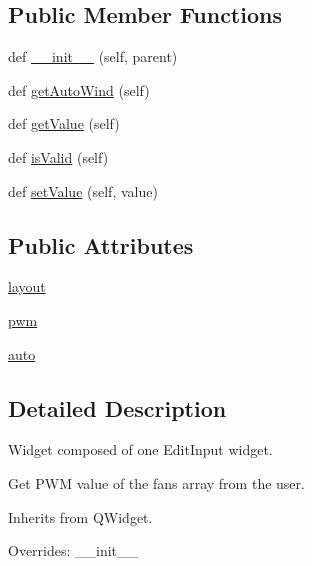 \subsection*{Public Member Functions}
\begin{DoxyCompactItemize}
\item 
def \mbox{\hyperlink{classwindshape_1_1gui_1_1widgets_1_1tabs_1_1_wind_widget_1_1_wind_widget_af310bfc32d34d64c99bcb53f099fd768}{\+\_\+\+\_\+init\+\_\+\+\_\+}} (self, parent)
\item 
def \mbox{\hyperlink{classwindshape_1_1gui_1_1widgets_1_1tabs_1_1_wind_widget_1_1_wind_widget_aecd304cd2808c9612696cf3171cafe6c}{get\+Auto\+Wind}} (self)
\item 
def \mbox{\hyperlink{classwindshape_1_1gui_1_1widgets_1_1tabs_1_1_wind_widget_1_1_wind_widget_ac7b6bebf61dcc8dbe6e48eeb0cc0e0d3}{get\+Value}} (self)
\item 
def \mbox{\hyperlink{classwindshape_1_1gui_1_1widgets_1_1tabs_1_1_wind_widget_1_1_wind_widget_a0d1cda4b6be95b96fddf4e0b6938c974}{is\+Valid}} (self)
\item 
def \mbox{\hyperlink{classwindshape_1_1gui_1_1widgets_1_1tabs_1_1_wind_widget_1_1_wind_widget_a1b237f38dd4e526c35e2094327cc0cad}{set\+Value}} (self, value)
\end{DoxyCompactItemize}
\subsection*{Public Attributes}
\begin{DoxyCompactItemize}
\item 
\mbox{\hyperlink{classwindshape_1_1gui_1_1widgets_1_1tabs_1_1_wind_widget_1_1_wind_widget_a306f73171b6ac5ad4d4d1baad3c79ec7}{layout}}
\item 
\mbox{\hyperlink{classwindshape_1_1gui_1_1widgets_1_1tabs_1_1_wind_widget_1_1_wind_widget_abcd74adbdb531340cf92ecdff5cd147c}{pwm}}
\item 
\mbox{\hyperlink{classwindshape_1_1gui_1_1widgets_1_1tabs_1_1_wind_widget_1_1_wind_widget_ab404823b0014ff499e79ccfe66586a5f}{auto}}
\end{DoxyCompactItemize}


\subsection{Detailed Description}
\begin{DoxyVerb}Widget composed of one EditInput widget.

Get PWM value of the fans array from the user.

Inherits from QWidget.

Overrides: __init__
\end{DoxyVerb}
 

